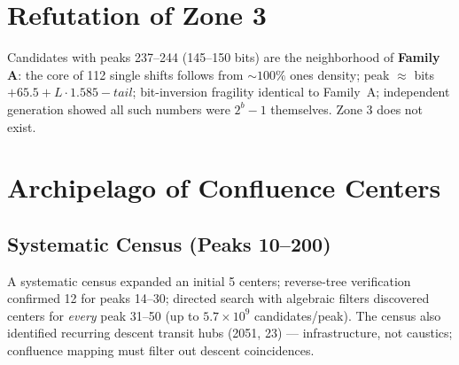 \documentclass[12pt,a4paper]{article}
\theoremstyle{remark}
\begin{document}
\section{Refutation of Zone 3}
Candidates with peaks 237--244 (145--150 bits) are the neighborhood of \textbf{Family A}: the core of 112 single shifts follows from $\sim100\%$ ones density; peak $\approx$ bits $+65.5+L\cdot1.585-tail$; bit-inversion fragility identical to Family~A; independent generation showed all such numbers were $2^b-1$ themselves. Zone 3 does not exist.

\section{Archipelago of Confluence Centers}
\subsection{Systematic Census (Peaks 10--200)}
A systematic census expanded an initial 5 centers; reverse-tree verification confirmed 12 for peaks 14--30; directed search with algebraic filters discovered centers for \emph{every} peak 31--50 (up to $5.7\times10^9$ candidates/peak). The census also identified recurring descent transit hubs (2051, 23) --- infrastructure, not caustics; confluence mapping must filter out descent coincidences.
\end{document}

